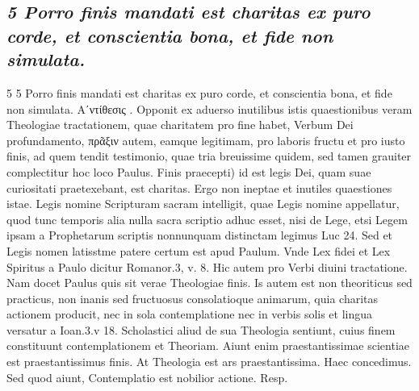 \documentclass{article}
\begin{document}
\begin{pages}
\subsection*{\textit{5 Porro finis mandati est charitas ex puro corde, et conscientia bona, et fide non simulata.}}5 5 Porro finis mandati est charitas ex puro corde, et conscientia bona, et fide non simulata. Αʹντίθεσις . Opponit ex aduerso inutilibus istis quaestionibus veram Theologiae tractationem, quae charitatem pro fine habet, Verbum Dei profundamento, πρᾶξιν autem, eamque legitimam, pro laboris fructu et pro iusto finis, ad quem tendit testimonio, quae tria breuissime quidem, sed tamen grauiter complectitur hoc loco Paulus. Finis praecepti) id est legis Dei, quam suae curiositati praetexebant, est charitas. Ergo non ineptae et inutiles quaestiones istae. Legis nomine Scripturam sacram intelligit, quae Legis nomine appellatur, quod tunc temporis alia nulla sacra scriptio adhuc esset, nisi de Lege, etsi Legem ipsam a Prophetarum scriptis nonnunquam distinctam legimus Luc 24. Sed et Legis nomen latisstme patere certum est apud Paulum. Vnde Lex fidei et Lex Spiritus a Paulo dicitur Romanor.3, v. 8. Hic autem pro Verbi diuini tractatione. Nam docet Paulus quis sit verae Theologiae finis. Is autem est non theoriticus sed practicus, non inanis sed fructuosus consolatioque animarum, quia charitas actionem producit, nec in sola contemplatione nec in verbis solis et lingua versatur a Ioan.3.v 18. Scholastici aliud de sua Theologia sentiunt, cuius finem constituunt contemplationem et Theoriam. Aiunt enim praestantissimae scientiae est praestantissimus finis. At Theologia est ars praestantissima. Haec concedimus. Sed quod aiunt, Contemplatio est nobilior actione. Resp.  \pend

\end{pages}
\end{document}
